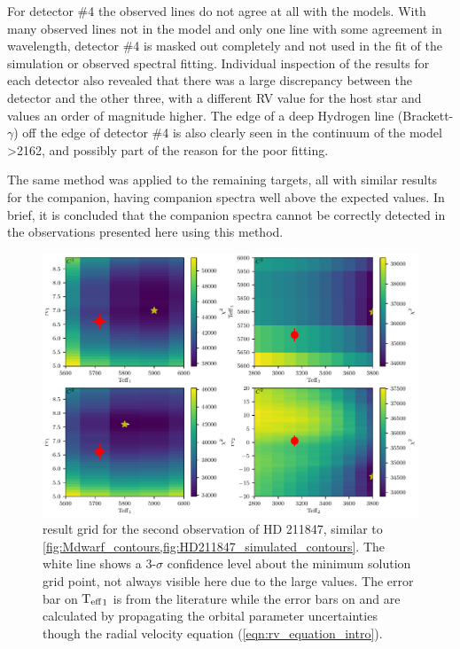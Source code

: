 For detector \#4 the observed lines do not agree at all with the models.
With many observed lines not in the model and only one line with some agreement in wavelength, detector \#4 is masked out completely and not used in the \textchisquared{} fit of the simulation or observed spectral fitting.
Individual inspection of the \textchisquared{} results for each detector also revealed that there was a large discrepancy between the  detector and the other three, with a different {RV} value for the host star and \textchisquared{} values an order of magnitude higher.
The edge of a deep Hydrogen line (Brackett-\(\gamma\)) off the edge of detector \#4 is also clearly seen in the continuum of the model >2162\nm{}, and possibly part of the reason for the poor fitting.

The same method was applied to the remaining targets, all with similar results for the companion, having companion spectra well above the expected values.
In brief, it is concluded that the companion spectra cannot be correctly detected in the observations presented here using this method.

\begin{figure}
    \centering
    \includegraphics[width=0.8\linewidth]{figures/companion_recovery/HD211847_result_pcolors}
    \caption[\textchisquared{} contour for an observation {HD 211847}.]{\textchisquared{} result grid for the second observation of {HD 211847}, similar to \cref{fig:Mdwarf_contours,fig:HD211847_simulated_contours}.
        The white line shows a 3-\(\sigma\) confidence level about the minimum \textchisquared{} solution grid point, not always visible here due to the large \textchisquared{} values.
        The error bar on \({\textrm{T}_{\mathrm{eff}}}_{1}\) is from the literature while the error bars on \Rvone{} and \Rvtwo{} are calculated by propagating the orbital parameter uncertainties though the radial velocity equation (\cref{eqn:rv_equation_intro}).}
    \label{fig:HD211847_result_contours}
\end{figure}


